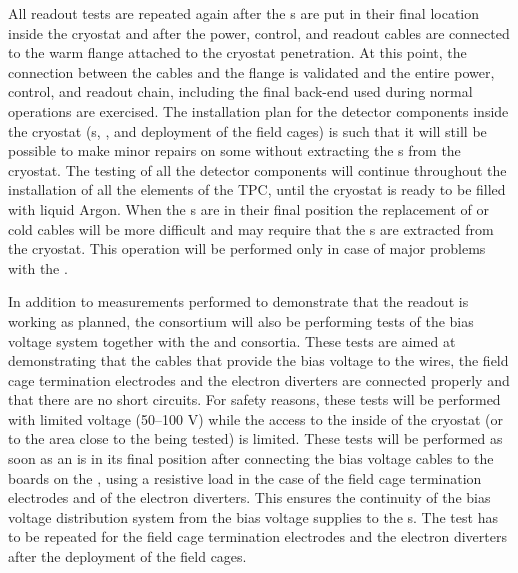 All readout tests are repeated again after the s are put
in their final location inside the cryostat and after the power, control, and
readout cables are connected to the warm flange attached to the cryostat
penetration. At this point, the connection between the cables and the flange
is validated and the entire power, control, and readout chain, including the
final  back-end used during normal operations are exercised. The
installation plan for the detector components inside the cryostat (s,
, and deployment of the field cages) is such that it will still
be possible to make minor repairs on some  without extracting
the s from the cryostat. The testing of all the detector components
will continue throughout the installation of all the elements of the TPC, 
until the cryostat is ready to be filled with liquid Argon.  When the 
s are in their final position the replacement of  
or cold cables will be more difficult and may require that the s 
are extracted from the cryostat. This operation will be performed only in 
case of major problems with the .

In addition to measurements performed to demonstrate that the 
readout is working as planned, the  consortium will also
be performing tests of the bias voltage system together with the 
and  consortia. These tests are aimed at demonstrating that
the cables that provide the bias voltage to the  wires, the
field cage termination electrodes and the electron diverters are connected
properly and that there are no short circuits. For safety reasons, these
tests will be performed with limited voltage (50--100 V) while the access
to the inside of the cryostat (or to the area close to the  being
tested) is limited. These tests will be performed as soon as an 
is in its final position after connecting the bias voltage cables to the 
 boards on the , using a resistive load in the case of the 
field cage termination electrodes and of the electron diverters. This ensures
the continuity of the bias voltage distribution system from the bias voltage
supplies to the s. The test has to be repeated for the field cage
termination electrodes and the electron diverters after the deployment of
the field cages.


